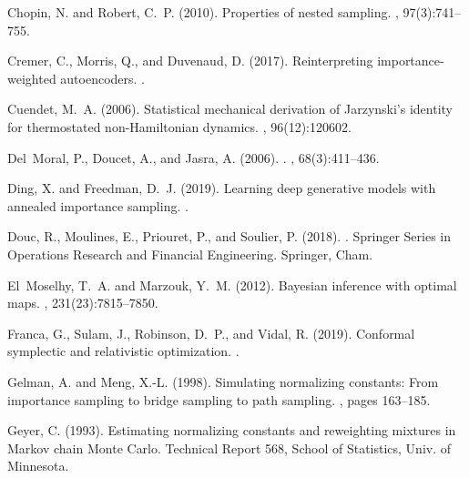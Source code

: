 \documentclass{article}
\newcommand{\1}{\mathds{1}}
\begin{document}
\begin{thebibliography}{50}
Chopin, N. and Robert, C.~P. (2010).
\newblock Properties of nested sampling.
, 97(3):741--755.

Cremer, C., Morris, Q., and Duvenaud, D. (2017).
\newblock Reinterpreting importance-weighted autoencoders.
.

Cuendet, M.~A. (2006).
\newblock Statistical mechanical derivation of {J}arzynski’s identity for
  thermostated non-{H}amiltonian dynamics.
, 96(12):120602.

Del~Moral, P., Doucet, A., and Jasra, A. (2006).
.
,
  68(3):411--436.

Ding, X. and Freedman, D.~J. (2019).
\newblock Learning deep generative models with annealed importance sampling.
.

Douc, R., Moulines, E., Priouret, P., and Soulier, P. (2018).
.
\newblock Springer Series in Operations Research and Financial Engineering.
  Springer, Cham.

El~Moselhy, T.~A. and Marzouk, Y.~M. (2012).
\newblock Bayesian inference with optimal maps.
, 231(23):7815--7850.

Franca, G., Sulam, J., Robinson, D.~P., and Vidal, R. (2019).
\newblock Conformal symplectic and relativistic optimization.
.

Gelman, A. and Meng, X.-L. (1998).
\newblock Simulating normalizing constants: From importance sampling to bridge
  sampling to path sampling.
, pages 163--185.

Geyer, C. (1993).
\newblock Estimating normalizing constants and reweighting mixtures in {M}arkov
  chain {M}onte {C}arlo.
\newblock Technical Report 568, School of Statistics, Univ. of Minnesota.


\end{thebibliography}
\end{document}
